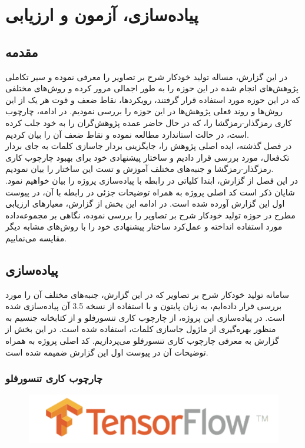 \chapter{پیاده‌سازی، آزمون و ارزیابی}
\section{مقدمه}

در این گزارش، مساله تولید خودکار شرح بر تصاویر را معرفی نموده و سیر تکاملی پژوهش‌های انجام شده در این حوزه را به طور اجمالی مرور کرده و روش‌های مختلفی که در این حوزه مورد استفاده قرار گرفتند، رویکردها، نقاط ضعف و قوت هر یک از این روش‌ها و روند فعلی پژوهش‌ها در این حوزه را بررسی نمودیم. در ادامه، چارچوب کاری رمزگذار-رمزگشا را، که در حال حاضر عمده پژوهش‌گران را به خود جلب کرده است، در حالت استاندارد مطالعه نموده و نقاط ضعف آن را بیان کردیم. 
\\
در فصل گذشته، ایده اصلی پژوهش را، جایگزینی بردار جاسازی کلمات به جای بردار تک‌فعال، مورد بررسی قرار دادیم و ساختار پیشنهادی خود برای بهبود چارچوب کاری رمزگذار-رمزگشا و جنبه‌های مختلف آموزش و تست این ساختار را بیان نمودیم.
\\
در این فصل از گزارش، ابتدا کلیاتی در رابطه با پیاده‌سازی پروژه را بیان خواهیم نمود. شایان ذکر است کد اصلی پروژه به همراه توضیحات جزئی در رابطه با آن، در پیوست اول این گزارش آورده شده است. در ادامه این بخش از گزارش، معیارهای ارزیابی مطرح در حوزه تولید خودکار شرح بر تصاویر را بررسی نموده، نگاهی بر مجموعه‌داده مورد استفاده انداخته و عمل‌کرد ساختار پیشنهادی خود را با روش‌های مشابه دیگر مقایسه می‌نماییم.
\section{پیاده‌سازی}
سامانه تولید خودکار شرح بر تصاویر که در این گزارش، جنبه‌های مختلف آن را مورد بررسی قرار داده‌ایم، به زبان پایتون و با استفاده از نسخه 3.5 آن پیاده‌سازی شده است. در پیاده‌سازی این پروژه، از چارچوب‌ کاری تنسورفلو و از کتابخانه جنسیم به منظور بهره‌گیری از ماژول جاسازی کلمات، استفاده شده است. در این بخش از گزارش به معرفی چارچوب کاری تنسورفلو می‌پردازیم. کد اصلی پروژه به همراه توضیحات آن در پیوست اول این گزارش ضمیمه شده است.
\subsection{چارچوب کاری تنسورفلو}
\begin{figure}[H]
	\centering
	\includegraphics[scale=0.2]{Imgs/tensor.png}
\end{figure}


